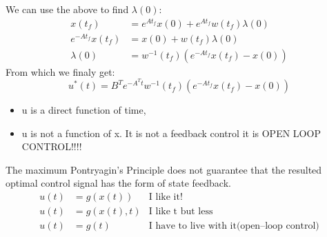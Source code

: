 {\begin{equation}
           
    \end{equation}
    We can use the above to find $\lambda(0)$:
     \begin{equation}
        
        \begin{aligned}
            x(t_f) &= e^{At_f}x(0) +e^{At_f}w(t_f)\lambda(0)\\
            e^{-At_f}x(t_f) &= x(0) + w(t_f)\lambda(0)\\
            \lambda(0)&= w^{-1}(t_f)(e^{-At_f}x(t_f)-x(0))
            
        \end{aligned}
    \end{equation}
    From which we finaly get:
    \begin{equation}
        u^{*}(t) = B^{T}e^{-A^{T}t}w^{-1}(t_f)(e^{-At_f}x(t_f)-x(0))
    \end{equation}
    \nt
    {
        \begin{itemize}
            \item u is a direct function of time,
            \item u is not a function of x. It is not a feedback control it is OPEN LOOP CONTROL!!!!
        \end{itemize}
        The maximum Pontryagin's Principle does not guarantee that the resulted optimal control signal has the  form of state feedback.\\
        \begin{equation}
            \begin{aligned}
                u(t)&=g(x(t))&\mbox{I like it!}\\[1.25ex]
                u(t)&=g(x(t),t)&\mbox{I like t but less}\\[1.25ex]
                u(t)&=g(t)&\mbox{I have to live with it(open--loop control)}\\[1.25ex]
                
            \end{aligned}
        \end{equation}
    }


}

